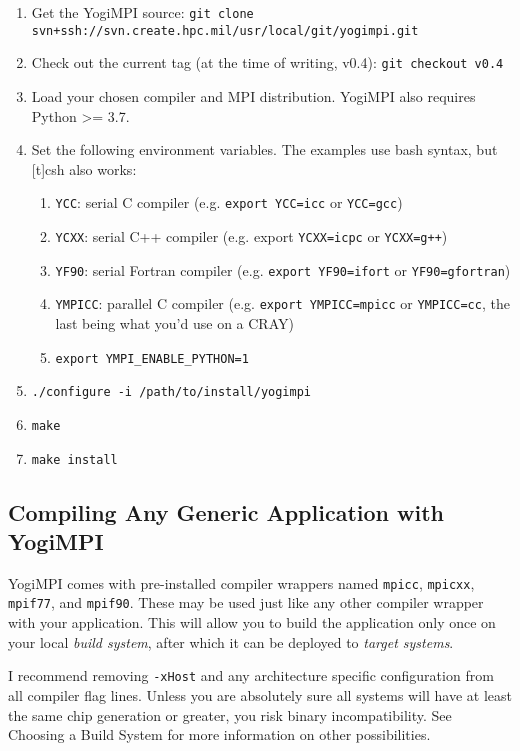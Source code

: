 \documentclass{article}
\begin{document}
\begin{enumerate}
\item Get the YogiMPI source: \texttt{git clone svn+ssh://svn.create.hpc.mil/usr/local/git/yogimpi.git}
\item Check out the current tag (at the time of writing, v0.4): \texttt{git checkout v0.4}
\item Load your chosen compiler and MPI distribution. YogiMPI also requires Python >= 3.7.
\item Set the following environment variables.  The examples use bash syntax, but [t]csh also works:
\begin{enumerate}
\item \texttt{YCC}: serial C compiler (e.g. \texttt{export YCC=icc} or \texttt{YCC=gcc})
\item \texttt{YCXX}: serial C++ compiler (e.g. export \texttt{YCXX=icpc} or \texttt{YCXX=g++})
\item \texttt{YF90}: serial Fortran compiler (e.g. \texttt{export YF90=ifort} or \texttt{YF90=gfortran})
\item \texttt{YMPICC}: parallel C compiler (e.g. \texttt{export YMPICC=mpicc} or \texttt{YMPICC=cc}, the last being what you'd use on a CRAY)
\item \texttt{export YMPI\_ENABLE\_PYTHON=1}
\end{enumerate}
\item \texttt{./configure -i /path/to/install/yogimpi}
\item \texttt{make}
\item \texttt{make install}
\end{enumerate}

\subsection{Compiling Any Generic Application with YogiMPI}
\label{generic:compile}
YogiMPI comes with pre-installed compiler wrappers named \texttt{mpicc}, \texttt{mpicxx}, \texttt{mpif77}, and \texttt{mpif90}.  These may be used just like any other compiler wrapper with your application.  This will allow you to build the application only once on your local \textit{build system}, after which it can be deployed to \textit{target systems}.

I recommend removing \texttt{-xHost} and any architecture specific configuration from all compiler flag lines. Unless you are absolutely sure all systems will have at least the same chip generation or greater, you risk binary incompatibility. See Choosing a Build System for more information on other possibilities.
\end{document}
